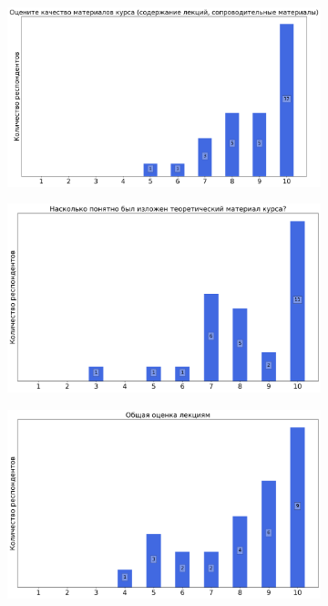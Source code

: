 \begin{figure}[H]
\begin{subfigure}[b]{0.45\textwidth}
			\end{subfigure}
			\begin{subfigure}[b]{0.45\textwidth}
				\centering
				\includegraphics[width=\textwidth]{images/2 course/Кратные интегралы и теория поля/lecturer-marks-Петрович А.Ю.-1.png}
			\end{subfigure}
			\begin{subfigure}[b]{0.45\textwidth}
				\centering
				\includegraphics[width=\textwidth]{images/2 course/Кратные интегралы и теория поля/lecturer-marks-Петрович А.Ю.-2.png}
			\end{subfigure}	
			\begin{subfigure}[b]{0.45\textwidth}
				\centering
				\includegraphics[width=\textwidth]{images/2 course/Кратные интегралы и теория поля/lecturer-marks-Петрович А.Ю.-3.png}

\end{subfigure}
\end{figure}
